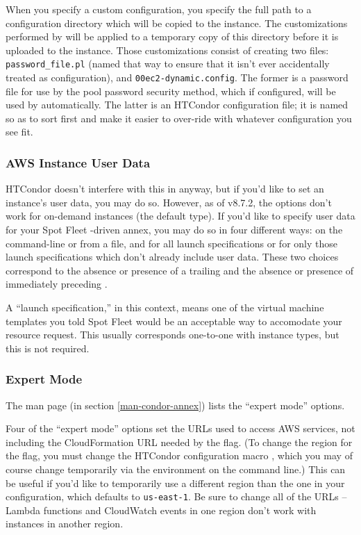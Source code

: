 When you specify a custom configuration, you specify the full path to a
configuration directory which will be copied to the instance.  The customizations
performed by  will be applied to a temporary copy of this
directory before it is uploaded to the instance.  Those customizations
consist of creating two files: {\tt password\_file.pl} (named that way to ensure
that it isn't ever accidentally treated as configuration), and
{\tt 00ec2-dynamic.config}.  The former is a password file for use by the pool
password security method, which if configured, will be used by 
automatically.  The latter is an HTCondor configuration file; it is named
so as to sort first and make it easier to over-ride with whatever configuration
you see fit.

\subsubsection{AWS Instance User Data}

HTCondor doesn't interfere with this in anyway, but if you'd like to set
an instance's user data, you may do so.  However, as of v8.7.2, the
 options don't work for on-demand instances (the default
type).  If you'd like to specify user data for your Spot Fleet -driven
annex, you may do so in four different ways: on the command-line or
from a file, and for all launch specifications or for only those launch
specifications which don't already include user data.  These two choices
correspond to the absence or presence of a trailing  and the
absence or presence of  immediately preceding .

A ``launch specification,'' in this context, means one of the virtual machine
templates you told Spot Fleet would be an acceptable way to accomodate your
resource request.  This usually corresponds one-to-one with instance types,
but this is not required.

\subsubsection{Expert Mode}

The man page (in section \ref{man-condor-annex}) lists the ``expert
mode'' options.

Four of the ``expert mode'' options set the URLs used to access AWS services,
not including the CloudFormation URL needed by the  flag.  (To
change the region for the  flag, you must change the HTCondor
configuration macro , which you may of
course change temporarily via the environment on the command line.)  This
can be useful if you'd like to temporarily use a different region than the
one in your configuration, which defaults to {\tt us-east-1}.  Be sure to
change all of the URLs -- Lambda functions and CloudWatch events in one
region don't work with instances in another region.

